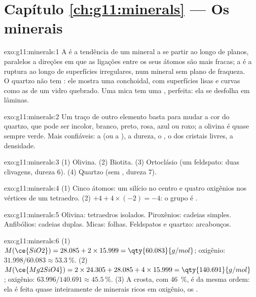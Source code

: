 \section*{Capítulo \ref{ch:g11:minerals} --- Os minerais}

\begin{solution}{exo:g11:minerals:1}
A  é a tendência de um mineral a se partir ao longo de planos,
paralelos a direções em que as ligações entre os seus átomos são mais
fracas; a  é a ruptura ao longo de superfícies irregulares, num
mineral sem plano de fraqueza. O quartzo não tem : ele mostra uma
 conchoidal, com superfícies lisas e curvas como as de um vidro
quebrado. Uma mica tem uma , perfeita: ela se desfolha em lâminas.
\end{solution}

\begin{solution}{exo:g11:minerals:2}
Um traço de outro elemento basta para mudar a cor do quartzo, que pode ser
incolor, branco, preto, rosa, azul ou roxo; a olivina é quase sempre verde.
Mais confiáveis: a  (ou a ), a dureza, o , o  dos
cristais livres, a densidade.
\end{solution}

\begin{solution}{exo:g11:minerals:3}
(1) Olivina. (2) Biotita. (3) Ortoclásio (um feldspato: duas clivagens,
dureza 6). (4) Quartzo (sem , dureza 7).
\end{solution}

\begin{solution}{exo:g11:minerals:4}
(1) Cinco átomos: um silício no centro e quatro oxigênios nos vértices de um
tetraedro. (2) $+4 + 4 \times (-2) = -4$: o grupo é .
\end{solution}

\begin{solution}{exo:g11:minerals:5}
Olivina: tetraedros isolados. Piroxênios: cadeias simples. Anfibólios:
cadeias duplas. Micas: folhas. Feldspatos e quartzo: arcabouços.
\end{solution}

\begin{solution}{exo:g11:minerals:6}
(1) $M(\ce{SiO2}) = 28.085 + 2 \times 15.999 = \qty{60.083}{g/mol}$;
oxigênio: $31.998/60.083 \approx \qty{53.3}{\percent}$.
(2) $M(\ce{Mg2SiO4}) = 2 \times 24.305 + 28.085 + 4 \times 15.999 =
\qty{140.691}{g/mol}$; oxigênio: $63.996/140.691 \approx \qty{45.5}{\percent}$.
(3) A crosta, com \qty{46}{\percent}, é da mesma ordem: ela é feita quase
inteiramente de minerais ricos em oxigênio, os .
\end{solution}

